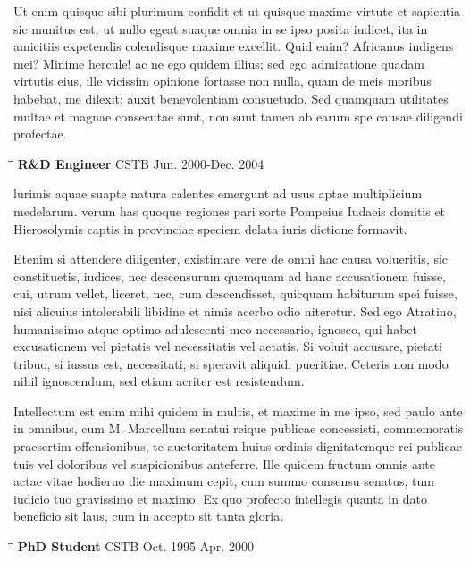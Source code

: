 \documentclass{res}
\begin{document}
\begin{resume}
Ut enim quisque sibi plurimum confidit et ut quisque maxime virtute et sapientia sic munitus est, ut nullo egeat suaque omnia in se ipso posita iudicet, ita in amicitiis expetendis colendisque maxime excellit. Quid enim? Africanus indigens mei? Minime hercule! ac ne ego quidem illius; sed ego admiratione quadam virtutis eius, ille vicissim opinione fortasse non nulla, quam de meis moribus habebat, me dilexit; auxit benevolentiam consuetudo. Sed quamquam utilitates multae et magnae consecutae sunt, non sunt tamen ab earum spe causae diligendi profectae.

   \begin{tabbing}
   \hspace{2.3in}\= \hspace{2.4in}\= \kill %
    {\bf R\&D Engineer} \>CSTB \> Jun. 2000-Dec. 2004

   \end{tabbing}\vspace{-20pt}
lurimis aquae suapte natura calentes emergunt ad usus aptae multiplicium medelarum. verum has quoque regiones pari sorte Pompeius Iudaeis domitis et Hierosolymis captis in provinciae speciem delata iuris dictione formavit.

Etenim si attendere diligenter, existimare vere de omni hac causa volueritis, sic constituetis, iudices, nec descensurum quemquam ad hanc accusationem fuisse, cui, utrum vellet, liceret, nec, cum descendisset, quicquam habiturum spei fuisse, nisi alicuius intolerabili libidine et nimis acerbo odio niteretur. Sed ego Atratino, humanissimo atque optimo adulescenti meo necessario, ignosco, qui habet excusationem vel pietatis vel necessitatis vel aetatis. Si voluit accusare, pietati tribuo, si iussus est, necessitati, si speravit aliquid, pueritiae. Ceteris non modo nihil ignoscendum, sed etiam acriter est resistendum.

Intellectum est enim mihi quidem in multis, et maxime in me ipso, sed paulo ante in omnibus, cum M. Marcellum senatui reique publicae concessisti, commemoratis praesertim offensionibus, te auctoritatem huius ordinis dignitatemque rei publicae tuis vel doloribus vel suspicionibus anteferre. Ille quidem fructum omnis ante actae vitae hodierno die maximum cepit, cum summo consensu senatus, tum iudicio tuo gravissimo et maximo. Ex quo profecto intellegis quanta in dato beneficio sit laus, cum in accepto sit tanta gloria.

   \begin{tabbing}
   \hspace{2.3in}\= \hspace{2.6in}\= \kill %
    {\bf PhD Student} \>CSTB \> Oct. 1995-Apr. 2000


\end{tabbing}
\end{resume}
\end{document}
